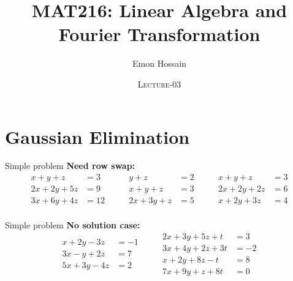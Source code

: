 \documentclass[11pt]{beamer}
\author[] %
{Emon Hossain\inst{1}}
\institute[University of Dhaka] %
{
  \inst{1}%
  Lecturer\\MNS department\\Brac University
}
\date[] %
{\textsc{Lecture-03}}
\title[]{MAT216: Linear Algebra and Fourier Transformation}
\theoremstyle{plain}
\begin{document}
\begin{frame}
\titlepage
\end{frame}

\section{Gaussian Elimination}


\begin{frame}{Simple problem}
    \textbf{Need row swap:}
$$
\begin{aligned}
x+ y + z &= 3 \\
2x + 2y + 5z &= 9\\
3x + 6y + 4z &= 12 \\
\end{aligned}\qquad
\begin{aligned}
y + z &= 2 \\
x + y + z &= 3 \\
2x + 3y + z &= 5 \\
\end{aligned}\qquad
\begin{aligned}
x+ y + z &= 3 \\
2x + 2y + 2z &= 6\\
x + 2y + 3z &= 4 \\
\end{aligned}
$$
\end{frame}

\begin{frame}{Simple problem}
\textbf{No solution case:}
$$
\begin{aligned}
x+ 2y -3z &= -1 \\
3x -y + 2z &= 7\\
5x + 3y - 4z &= 2 \\
\end{aligned}\qquad
\begin{aligned}
2x+ 3y + 5z + t&= 3 \\
3x + 4y + 2z + 3t&= -2\\
x + 2y + 8z - t&= 8 \\
7x+9y+z+8t &=0\\
\end{aligned}
$$
\end{frame}
\end{document}
